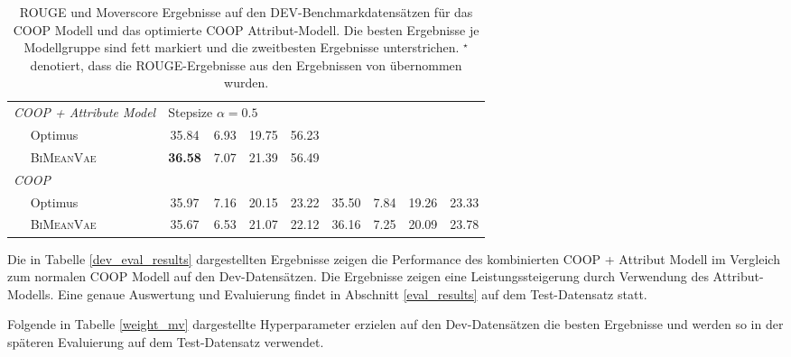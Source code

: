 \begin{table}[!h]
\begin{tabular}{@{}lcccccccc@{}}
    \textit{COOP + Attribute Model}        &    \multicolumn{3}{l}{Stepsize $\alpha= 0.5$}            &        &   & &     \\
    $\quad$ Optimus            & 35.84  &6.93 & 19.75& 56.23&     &      &   &   \\ 
    $\quad$ \textsc{BiMeanVae}& \textbf{36.58} & 7.07 & 21.39 & 56.49 & & & &\\ \midrule %

    \textit{COOP}              &         &         &        &        &        & &   &    \\
    $\quad$ Optimus        & 35.97 & 7.16 & 20.15 & 23.22 & 35.50  & 7.84  & 19.26 & 23.33\\  %
    $\quad$ \textsc{BiMeanVae} &  35.67 &6.53 & 21.07 & 22.12 & 36.16	&7.25&20.09 & 23.78\\ 
    
    	\bottomrule
    
    \end{tabular}
    \caption{ROUGE und Moverscore Ergebnisse auf den DEV-Benchmarkdatensätzen für das COOP Modell und das optimierte COOP Attribut-Modell. Die besten Ergebnisse je Modellgruppe sind fett markiert und die zweitbesten Ergebnisse unterstrichen.
    $^{\star}$ denotiert, dass die ROUGE-Ergebnisse aus den Ergebnissen von \citep{coop} übernommen wurden.
    }
\end{table}

Die in Tabelle \ref{dev_eval_results} dargestellten Ergebnisse zeigen die Performance des kombinierten COOP + Attribut Modell im Vergleich zum normalen COOP Modell auf den Dev-Datensätzen.
Die Ergebnisse zeigen eine Leistungssteigerung durch Verwendung des Attribut-Modells. Eine genaue Auswertung und Evaluierung findet in Abschnitt \ref{eval_results} auf dem Test-Datensatz statt.

Folgende in Tabelle \ref{weight_mv} dargestellte Hyperparameter erzielen auf den Dev-Datensätzen die besten Ergebnisse und werden so in der späteren Evaluierung auf dem Test-Datensatz verwendet.

